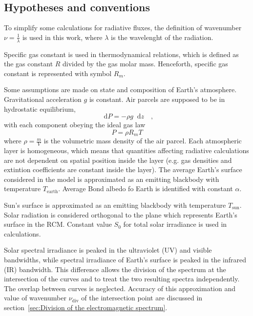 \documentclass[a4paper,10pt,final,twocolumn]{article}
\newcommand{\dd}{\mathop{}\!\mathrm{d}}
\begin{document}
\subsection{Hypotheses and conventions}
\label{sec:Hypotheses and conventions}
To simplify some calculations for radiative fluxes, the definition of wavenumber $\nu = \frac{1}{\lambda}$ is used in this work, where $\lambda$ is the wavelenght of the radiation.

Specific gas constant is used in thermodynamical relations, which is defined as the gas constant $R$ divided by the gas molar mass. Henceforth, specific gas constant is represented with symbol $R_m$.

Some assumptions are made on state and composition of Earth's atmosphere. Gravitational acceleration $g$ is constant. Air parcels are supposed to be in hydrostatic equilibrium,
\begin{equation}
  \label{eq:hydrostatic_equilibrium}
  \dd P = - \rho g \dd z
  \quad ,
\end{equation}
with each component obeying the ideal gas law
\begin{equation}
  \label{eq:ideal_gas_law}
  P = \rho R_m T
\end{equation}
where $\rho = \frac{m}{V}$ is the volumetric mass density of the air parcel. Each atmospheric layer is homogeneous, which means that quantities affecting radiative calculations are not dependent on spatial position inside the layer (e.g. gas densities and extintion coefficients are constant inside the layer).
The average Earth's surface considered in the model is approximated as an emitting blackbody with temperature $T_\text{earth}$. Average Bond albedo fo Earth is identified with constant $\alpha$.

Sun's surface is approximated as an emitting blackbody with temperature $T_\text{sun}$. Solar radiation is considered orthogonal to the plane which represents Earth's surface in the RCM. Constant value $S_0$ for total solar irradiance is used in calculations.

Solar spectral irradiance is peaked in the ultraviolet (UV) and visible bandwidths, while spectral irradiance of Earth's surface is peaked in the infrared (IR) bandwidth. This difference allows the division of the spectrum at the intersection of the curves and to treat the two resulting spectra independently. The overlap between curves is neglected. Accuracy of this approximation and value of wavenumber $\nu_\text{div}$ of the intersection point are discussed in section~\ref{sec:Division of the electromagnetic spectrum}.
\end{document}
